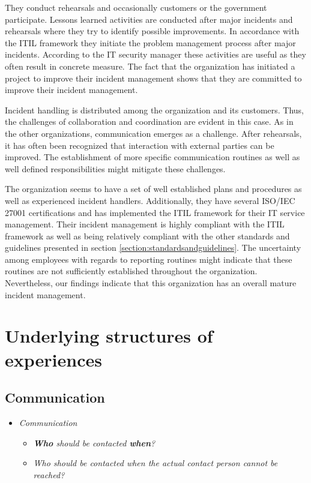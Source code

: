 They conduct rehearsals and occasionally customers or the government participate. Lessons learned activities are conducted after major incidents and rehearsals where they try to identify possible improvements. In accordance with the ITIL framework they initiate the problem management process after major incidents. According to the IT security manager these activities are useful as they often result in concrete measure. The fact that the organization has initiated a project to improve their incident management shows that they are committed to improve their incident management.

Incident handling is distributed among the organization and its customers. Thus, the challenges of collaboration and coordination are evident in this case. As in the other organizations, communication emerges as a challenge. After rehearsals, it has often been recognized that interaction with external parties can be improved. The establishment of more specific communication routines as well as well defined responsibilities might mitigate these challenges.

The organization seems to have a set of well established plans and procedures as well as experienced incident handlers. Additionally, they have several ISO/IEC 27001 certifications and has implemented the ITIL framework for their IT service management. Their incident management is highly compliant with the ITIL framework as well as being relatively compliant with the other standards and guidelines presented in section \ref{section:standardsandguidelines}. The uncertainty among employees with regards to reporting routines might indicate that these routines are not sufficiently established throughout the organization. Nevertheless, our findings indicate that this organization has an overall mature incident management. 

\section{Underlying structures of experiences}
\subsection{Communication}
\begin{itemize}
\item \textit{Communication}
\begin{itemize}
\item \textit{\textbf{Who} should be contacted \textbf{when}?}
\item \textit{Who should be contacted when the actual contact person cannot be reached?}
\end{itemize}
\end{itemize}

